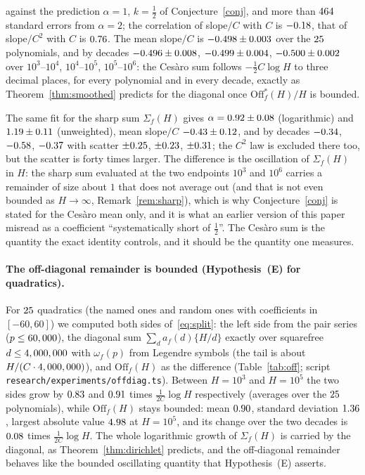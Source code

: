 \documentclass[11pt,a4paper]{article}
\theoremstyle{remark}\newtheorem{remark}[theorem]{Remark}
\begin{document}
against the prediction $\alpha=1$, $k=\tfrac12$ of Conjecture~\ref{conj}, and more than $464$ standard
errors from $\alpha=2$; the correlation of slope$/C$ with $C$ is $-0.18$, that of slope$/C^2$ with $C$ is
$0.76$. The mean slope$/C$ is $-0.498\pm0.003$ over the $25$ polynomials, and by decades
$-0.496\pm0.008$, $-0.499\pm0.004$, $-0.500\pm0.002$ over $10^3$--$10^4$, $10^4$--$10^5$,
$10^5$--$10^6$: the Ces\`aro sum follows $-\tfrac12C\log H$ to three decimal places, for every polynomial and in every
decade, exactly as Theorem~\ref{thm:smoothed} predicts for the diagonal once $\mathrm{Off}^\ast_f(H)/H$ is bounded.

The same fit for the sharp sum $\Sigma_f(H)$ gives $\alpha=0.92\pm0.08$ (logarithmic) and
$1.19\pm0.11$ (unweighted), mean slope$/C$ $-0.43\pm0.12$, and by decades $-0.34$, $-0.58$,
$-0.37$ with scatter $\pm0.25$, $\pm0.23$, $\pm0.31$; the $C^2$ law is excluded there too, but the scatter is
forty times larger. The difference is the oscillation of $\Sigma_f(H)$ in $H$: the sharp sum evaluated
at the two endpoints $10^3$ and $10^6$ carries a remainder of size about $1$ that does not average out (and that is
not even bounded as $H\to\infty$, Remark~\ref{rem:sharp}), which is why Conjecture~\ref{conj} is stated for the
Ces\`aro mean only, and it is what an earlier version of this paper misread
as a coefficient ``systematically short of $\tfrac12$''. The Ces\`aro sum is the quantity the exact identity
controls, and it should be the quantity one measures.

\paragraph{The off-diagonal remainder is bounded (Hypothesis~(E) for quadratics).} For $25$
quadratics (the named ones and random ones with coefficients in $[-60,60]$) we computed both sides
of~\eqref{eq:split}: the left side from the pair series ($p\le60,000$), the diagonal sum
$\sum_da_f(d)\{H/d\}$ exactly over squarefree $d\le4,000,000$ with $\omega_f(p)$ from Legendre symbols
(the tail is about $H/(C\cdot4,000,000)$), and $\mathrm{Off}_f(H)$ as the difference
(Table~\ref{tab:off}; script \texttt{research/experiments/offdiag.ts}). Between $H=10^3$ and $H=10^5$ the two sides grow
by $0.83$ and $0.91$ times $\frac1{2C}\log H$ respectively (averages over the
$25$ polynomials), while $\mathrm{Off}_f(H)$ stays bounded: mean $0.90$, standard deviation
$1.36$, largest absolute value $4.98$ at $H=10^5$, and its change over the two decades is
$0.08$ times $\frac1{2C}\log H$. The whole logarithmic growth of $\Sigma_f(H)$ is carried by
the diagonal, as Theorem~\ref{thm:dirichlet} predicts, and the off-diagonal remainder behaves like the
bounded oscillating quantity that Hypothesis~(E) asserts.
\end{document}

